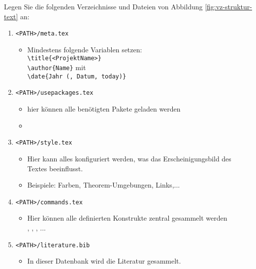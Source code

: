 	Legen Sie die folgenden Verzeichnisse und Dateien von Abbildung \ref{fig:vz-struktur-text} an:
	\begin{enumerate}
		\item \texttt{<PATH>/meta.tex}
		\begin{itemize}\small
			\item Mindestens folgende Variablen setzen: \\
			\hspace*{0.5cm}\texttt{\textbackslash title\{<ProjektName>\}}\\
			\hspace*{0.5cm}\texttt{\textbackslash author\{Name\}} mit \\
			\hspace*{0.5cm}\texttt{\textbackslash date\{Jahr (, Datum, today)\}}	
		\end{itemize}
		\item \texttt{<PATH>/usepackages.tex}
		\begin{itemize}\small
			\item hier können alle benötigten Pakete geladen werden 
			\item[] ~~~~~
		\end{itemize}
		\item \texttt{<PATH>/style.tex}
		\begin{itemize}\small
			\item Hier kann alles konfiguriert werden, was das Erscheinigungsbild des Textes beeinflusst.
			\item Beispiele: Farben, Theorem-Umgebungen, Links,...
		\end{itemize}
		\item \texttt{<PATH>/commands.tex}
		\begin{itemize}\small
			\item Hier können alle definierten Konstrukte zentral gesammelt werden\\
			\hspace*{0.5cm} ,
			\hspace*{0.5cm} ,
			\hspace*{0.5cm} , ...
		\end{itemize}
		\item \texttt{<PATH>/literature.bib}
		\begin{itemize}\small
			\item In dieser Datenbank wird die Literatur gesammelt.

\end{itemize}
\end{enumerate}
